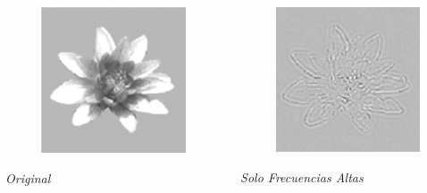 \documentclass[
11pt, %
%
aspectratio=169, %
]{beamer}
\begin{document}
\begin{frame}
\begin{columns}[c]
     	\begin{column}{0.3\textwidth}
     		\centering
     		\begin{figure}     				
     			\includegraphics[scale=0.45]{Graphics/flower}
     		\end{figure}
     		\textit{Original}
     	\end{column}
     	
     	\begin{column}{0.3\textwidth} %
     		\centering
     		\begin{figure}     				
     			\includegraphics[scale=0.45]{Graphics/high_sf}
     		\end{figure}
     	
     	\textit{Solo Frecuencias Altas}    		
     		
     	\end{column}
     \end{columns}
    	
     	
     	
     \end{frame}
	
\end{document}
